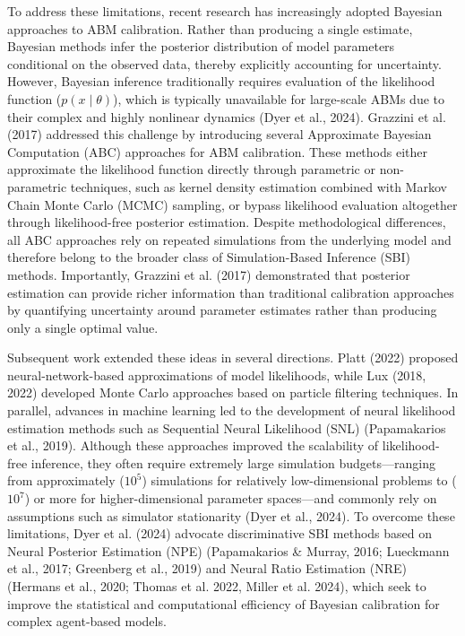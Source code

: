 \documentclass[12pt]{article}
\begin{document}
To address these limitations, recent research has increasingly adopted Bayesian approaches to ABM calibration. Rather than producing a single estimate, Bayesian methods infer the posterior distribution of model parameters conditional on the observed data, thereby explicitly accounting for uncertainty. However, Bayesian inference traditionally requires evaluation of the likelihood function ($p(x \mid \theta)$), which is typically unavailable for large-scale ABMs due to their complex and highly nonlinear dynamics (Dyer et al., 2024). Grazzini et al. (2017) addressed this challenge by introducing several Approximate Bayesian Computation (ABC) approaches for ABM calibration. These methods either approximate the likelihood function directly through parametric or non-parametric techniques, such as kernel density estimation combined with Markov Chain Monte Carlo (MCMC) sampling, or bypass likelihood evaluation altogether through likelihood-free posterior estimation. Despite methodological differences, all ABC approaches rely on repeated simulations from the underlying model and therefore belong to the broader class of Simulation-Based Inference (SBI) methods. Importantly, Grazzini et al. (2017) demonstrated that posterior estimation can provide richer information than traditional calibration approaches by quantifying uncertainty around parameter estimates rather than producing only a single optimal value.

Subsequent work extended these ideas in several directions. Platt (2022) proposed neural-network-based approximations of model likelihoods, while Lux (2018, 2022) developed Monte Carlo approaches based on particle filtering techniques. In parallel, advances in machine learning led to the development of neural likelihood estimation methods such as Sequential Neural Likelihood (SNL) (Papamakarios et al., 2019). Although these approaches improved the scalability of likelihood-free inference, they often require extremely large simulation budgets—ranging from approximately ($10^5$) simulations for relatively low-dimensional problems to ($10^7$) or more for higher-dimensional parameter spaces—and commonly rely on assumptions such as simulator stationarity (Dyer et al., 2024). To overcome these limitations, Dyer et al. (2024) advocate discriminative SBI methods based on Neural Posterior Estimation (NPE) (Papamakarios \& Murray, 2016; Lueckmann et al., 2017; Greenberg et al., 2019) and Neural Ratio Estimation (NRE) (Hermans et al., 2020; Thomas et al. 2022, Miller et al. 2024), which seek to improve the statistical and computational efficiency of Bayesian calibration for complex agent-based models.
\end{document}
